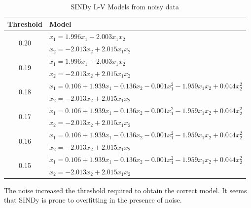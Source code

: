 \documentclass[11pt]{article}
\begin{document}
\begin{table}[H]
    \centering
    \caption{SINDy L-V Models from noisy data}
    \label{p1etab1}
    \begin{tabular}{|c|l|}
        \hline
        Threshold & Model \\
        \hline
        \hline
        \multirow{2}{*}{0.20} & $\dot{x}_1 = 1.996 x_1 - 2.003 x_1 x_2$ \\
                            & $\dot{x}_2 = -2.013 x_2 + 2.015 x_1 x_2$ \\
        \hline
        \multirow{2}{*}{0.19} & $\dot{x}_1 = 1.996 x_1 - 2.003 x_1 x_2$ \\
                            & $\dot{x}_2 = -2.013 x_2 + 2.015 x_1 x_2$ \\
        \hline
        \multirow{2}{*}{0.18} & $\dot{x}_1 = 0.106 + 1.939 x_1 - 0.136 x_2 - 0.001 x_1^2 - 1.959 x_1 x_2 + 0.044 x_2^2$ \\
                            & $\dot{x}_2 = -2.013 x_2 + 2.015 x_1 x_2$ \\
        \hline
        \multirow{2}{*}{0.17} & $\dot{x}_1 = 0.106 + 1.939 x_1 - 0.136 x_2 - 0.001 x_1^2 - 1.959 x_1 x_2 + 0.044 x_2^2$ \\
                            & $\dot{x}_2 = -2.013 x_2 + 2.015 x_1 x_2$ \\
        \hline
        \multirow{2}{*}{0.16} & $\dot{x}_1 = 0.106 + 1.939 x_1 - 0.136 x_2 - 0.001 x_1^2 - 1.959 x_1 x_2 + 0.044 x_2^2$ \\
                            & $\dot{x}_2 = -2.013 x_2 + 2.015 x_1 x_2$ \\
        \hline
        \multirow{2}{*}{0.15} & $\dot{x}_1 = 0.106 + 1.939 x_1 - 0.136 x_2 - 0.001 x_1^2 - 1.959 x_1 x_2 + 0.044 x_2^2$ \\
                            & $\dot{x}_2 = -2.013 x_2 + 2.015 x_1 x_2$ \\
        \hline
    \end{tabular}
\end{table}

The noise increased the threshold required to obtain the correct model. It seems that SINDy is prone to overfitting in the presence of noise.



\section{}
\end{document}
